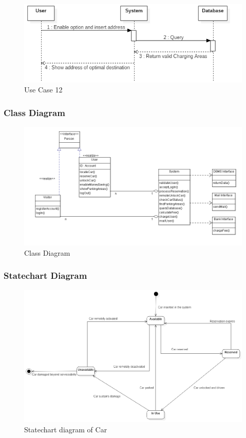 \FloatBarrier
\begin{figure}[h]
\centering
\includegraphics[width=\linewidth,keepaspectratio]{../Diagrams/SD/UC_12.png}
\caption{Use Case 12}
\end{figure}
\FloatBarrier

\clearpage
\subsubsection{Class Diagram}
\begin{figure}[h]
\centering
\includegraphics[width=\linewidth,keepaspectratio]{../Diagrams/CD/Class_Diagram.png}
\caption{Class Diagram}
\end{figure}
\FloatBarrier

\clearpage
\subsubsection{Statechart Diagram}
\begin{figure}[h]
\centering
\includegraphics[width=\linewidth,keepaspectratio]{../Diagrams/SCD/SCD_Car.png}
\caption{Statechart diagram of Car}
\end{figure}
\FloatBarrier

